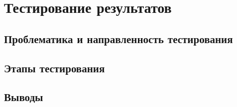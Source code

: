 \section{Тестирование результатов}

\subsection{Проблематика и направленность тестирования}

\subsection{Этапы тестирования}

\subsection{Выводы}
